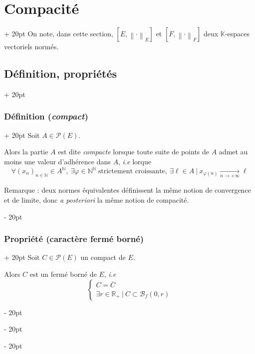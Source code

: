 \documentclass[a4paper, 12pt, twoside]{article}
\newcommand{\N}{\mathbb{N}} %
\newcommand{\R}{\mathbb{R}} %
\newcommand{\K}{\mathbb K}
\newcommand{\cj}[1]{\overline{#1}} %
\newcommand{\tendsto}[1]{\xrightarrow[#1]{}}
\newcommand{\lr}[1]{\left( #1 \right)}
\newcommand{\norm}[1]{\left\lVert #1 \right\rVert}
\newcommand{\ind}[1][20pt]{\advance\leftskip + #1}
\newcommand{\deind}[1][20pt]{\advance\leftskip - #1}
\newenvironment{indt}[2][20pt]{#2 \par \ind[#1]}{\par \deind} %
\begin{document}
    \vspace{12pt}
    
    \begin{indt}{\section{Compacité}}
        On note, dans cette section, $[E, \norm \cdot _E]$ et $[F, \norm \cdot _F]$ deux $\K$-espaces vectoriels normés.

        \begin{indt}{\subsection{Définition, propriétés}}
            \begin{indt}{\subsubsection{Définition (\textit{compact})}}
                Soit $A \in \mathcal P(E)$.

                Alors la partie $A$ est dite \emph{compacte} lorsque toute suite de points de $A$ admet au moins une valeur d'adhérence dans $A$, \textit{i.e} lorque
                \[
                    \forall \lr{x_n}_{n \in \N} \in A^\N,\
                    \exists \varphi \in \N^\N\ \text{strictement croissante},\
                    \exists \ell \in A\ |\
                    x_{\varphi(n)} \tendsto{n \to +\infty} \ell
                \]

                \vspace{6pt}
                
                Remarque : deux normes équivalentes définissent la même notion de convergence et de limite, donc \textit{a posteriori} la même notion de compacité.
            \end{indt}

            \vspace{12pt}
            
            \begin{indt}{\subsubsection{Propriété (caractère fermé borné)}}
                Soit $C \in \mathcal P(E)$ un compact de $E$.

                Alors $C$ est un fermé borné de $E$, \textit{i.e}
                \[
                    \begin{cases}
                        C = \cj C
                        \\
                        \exists r \in \R_+\ |\ C \subset \mathscr B_f(0, r)
                    \end{cases}
                \]
            \end{indt}


\end{indt}
\end{indt}
\end{document}
